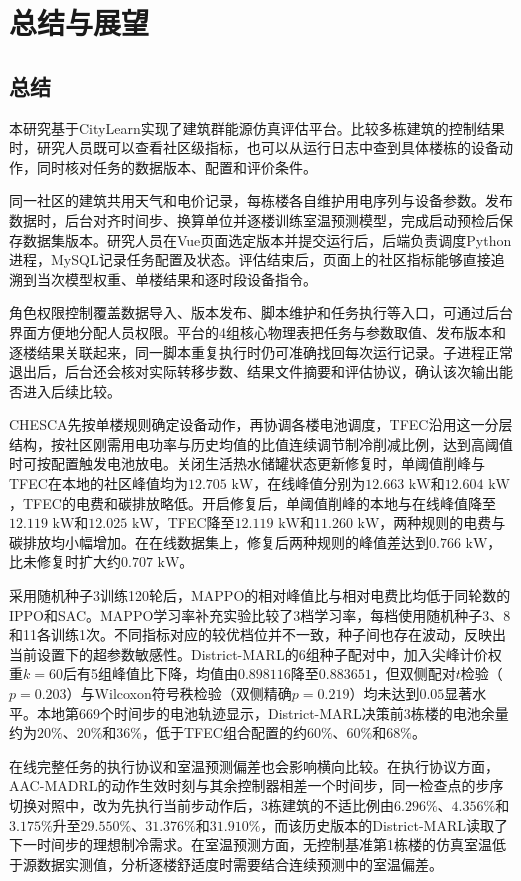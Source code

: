 \chapter{总结与展望}
\section{总结}\label{sec:algo-layer}
本研究基于CityLearn实现了建筑群能源仿真评估平台。比较多栋建筑的控制结果时，研究人员既可以查看社区级指标，也可以从运行日志中查到具体楼栋的设备动作，同时核对任务的数据版本、配置和评价条件。

同一社区的建筑共用天气和电价记录，每栋楼各自维护用电序列与设备参数。发布数据时，后台对齐时间步、换算单位并逐楼训练室温预测模型，完成启动预检后保存数据集版本。研究人员在Vue页面选定版本并提交运行后，后端负责调度Python进程，MySQL记录任务配置及状态。评估结束后，页面上的社区指标能够直接追溯到当次模型权重、单楼结果和逐时段设备指令。

角色权限控制覆盖数据导入、版本发布、脚本维护和任务执行等入口，可通过后台界面方便地分配人员权限。平台的4组核心物理表把任务与参数取值、发布版本和逐楼结果关联起来，同一脚本重复执行时仍可准确找回每次运行记录。子进程正常退出后，后台还会核对实际转移步数、结果文件摘要和评估协议，确认该次输出能否进入后续比较。

CHESCA先按单楼规则确定设备动作，再协调各楼电池调度，TFEC沿用这一分层结构，按社区刚需用电功率与历史均值的比值连续调节制冷削减比例，达到高阈值时可按配置触发电池放电。关闭生活热水储罐状态更新修复时，单阈值削峰与TFEC在本地的社区峰值均为$12.705\text{ kW}$，在线峰值分别为$12.663\text{ kW}$和$12.604\text{ kW}$，TFEC的电费和碳排放略低。开启修复后，单阈值削峰的本地与在线峰值降至$12.119\text{ kW}$和$12.025\text{ kW}$，TFEC降至$12.119\text{ kW}$和$11.260\text{ kW}$，两种规则的电费与碳排放均小幅增加。在在线数据集上，修复后两种规则的峰值差达到$0.766\text{ kW}$，比未修复时扩大约$0.707\text{ kW}$。

采用随机种子3训练120轮后，MAPPO的相对峰值比与相对电费比均低于同轮数的IPPO和SAC。MAPPO学习率补充实验比较了3档学习率，每档使用随机种子3、8和11各训练1次。不同指标对应的较优档位并不一致，种子间也存在波动，反映出当前设置下的超参数敏感性。District-MARL的6组种子配对中，加入尖峰计价权重$k=60$后有5组峰值比下降，均值由$0.898116$降至$0.883651$，但双侧配对$t$检验（$p=0.203$）与Wilcoxon符号秩检验（双侧精确$p=0.219$）均未达到$0.05$显著水平。本地第669个时间步的电池轨迹显示，District-MARL决策前3栋楼的电池余量约为$20\%$、$20\%$和$36\%$，低于TFEC组合配置的约$60\%$、$60\%$和$68\%$。

在线完整任务的执行协议和室温预测偏差也会影响横向比较。在执行协议方面，AAC-MADRL的动作生效时刻与其余控制器相差一个时间步，同一检查点的步序切换对照中，改为先执行当前步动作后，3栋建筑的不适比例由$6.296\%$、$4.356\%$和$3.175\%$升至$29.550\%$、$31.376\%$和$31.910\%$，而该历史版本的District-MARL读取了下一时间步的理想制冷需求。在室温预测方面，无控制基准第1栋楼的仿真室温低于源数据实测值，分析逐楼舒适度时需要结合连续预测中的室温偏差。

